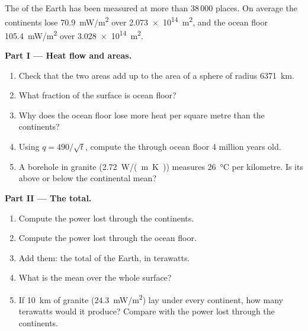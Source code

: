 \begin{problem}
\label{pb:g12:internal-heat:1}
The  of the Earth has been measured at more than 38\,000 places.
On average the continents lose \qty{70.9}{mW/m^2} over \qty{2.073e14}{m^2},
and the ocean floor \qty{105.4}{mW/m^2} over \qty{3.028e14}{m^2}.

\medskip
\noindent\textbf{Part I --- Heat flow and areas.}
\begin{enumerate}
  \item Check that the two areas add up to the area of a sphere of radius
        \qty{6371}{km}.
  \item What fraction of the surface is ocean floor?
  \item Why does the ocean floor lose more heat per square metre than the
        continents?
  \item Using $q = 490/\sqrt{t}$, compute the  through ocean floor
        4 million years old.
  \item A borehole in granite (\qty{2.72}{W/(m.K)}) measures
        \qty{26}{\celsius} per kilometre. Is its  above or below the
        continental mean?
\end{enumerate}

\medskip
\noindent\textbf{Part II --- The total.}
\begin{enumerate}[resume]
  \item Compute the power lost through the continents.
  \item Compute the power lost through the ocean floor.
  \item Add them: the total  of the Earth, in terawatts.
  \item What is the mean  over the whole surface?
  \item If \qty{10}{km} of granite (\qty{24.3}{mW/m^2}) lay under every
        continent, how many terawatts would it produce? Compare with the
        power lost through the continents.
\end{enumerate}


\end{problem}
